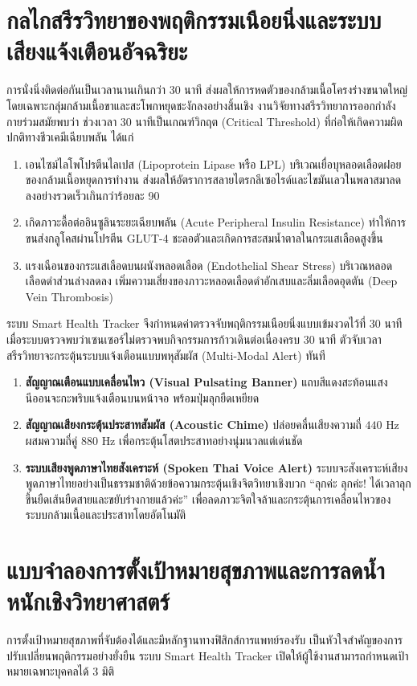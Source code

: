 \section{กลไกสรีรวิทยาของพฤติกรรมเนือยนิ่งและระบบเสียงแจ้งเตือนอัจฉริยะ}
การนั่งนิ่งติดต่อกันเป็นเวลานานเกินกว่า 30 นาที ส่งผลให้การหดตัวของกล้ามเนื้อโครงร่างขนาดใหญ่โดยเฉพาะกลุ่มกล้ามเนื้อขาและสะโพกหยุดชะงักลงอย่างสิ้นเชิง งานวิจัยทางสรีรวิทยาการออกกำลังกายร่วมสมัยพบว่า ช่วงเวลา 30 นาทีเป็นเกณฑ์วิกฤต (Critical Threshold) ที่ก่อให้เกิดความผิดปกติทางชีวเคมีเฉียบพลัน ได้แก่
\begin{enumerate}
    \item เอนไซม์ไลโพโปรตีนไลเปส (Lipoprotein Lipase หรือ LPL) บริเวณเยื่อบุหลอดเลือดฝอยของกล้ามเนื้อหยุดการทำงาน ส่งผลให้อัตราการสลายไตรกลีเซอไรด์และไขมันเลวในพลาสมาลดลงอย่างรวดเร็วเกินกว่าร้อยละ 90
    \item เกิดภาวะดื้อต่ออินซูลินระยะเฉียบพลัน (Acute Peripheral Insulin Resistance) ทำให้การขนส่งกลูโคสผ่านโปรตีน GLUT-4 ชะลอตัวและเกิดการสะสมน้ำตาลในกระแสเลือดสูงขึ้น
    \item แรงเฉือนของกระแสเลือดบนผนังหลอดเลือด (Endothelial Shear Stress) บริเวณหลอดเลือดดำส่วนล่างลดลง เพิ่มความเสี่ยงของภาวะหลอดเลือดดำอักเสบและลิ่มเลือดอุดตัน (Deep Vein Thrombosis)
\end{enumerate}

ระบบ Smart Health Tracker จึงกำหนดค่าตรวจจับพฤติกรรมเนือยนิ่งแบบเข้มงวดไว้ที่ 30 นาที เมื่อระบบตรวจพบว่าเซนเซอร์ไม่ตรวจพบกิจกรรมการก้าวเดินต่อเนื่องครบ 30 นาที ตัวจับเวลาสรีรวิทยาจะกระตุ้นระบบแจ้งเตือนแบบพหุสัมผัส (Multi-Modal Alert) ทันที
\begin{enumerate}
    \item \textbf{สัญญาณเตือนแบบเคลื่อนไหว (Visual Pulsating Banner)} แถบสีแดงสะท้อนแสงนีออนจะกะพริบแจ้งเตือนบนหน้าจอ พร้อมปุ่มลุกยืดเหยียด
    \item \textbf{สัญญาณเสียงกระตุ้นประสาทสัมผัส (Acoustic Chime)} ปล่อยคลื่นเสียงความถี่ $440\text{ Hz}$ ผสมความถี่คู่ $880\text{ Hz}$ เพื่อกระตุ้นโสตประสาทอย่างนุ่มนวลแต่เด่นชัด
    \item \textbf{ระบบเสียงพูดภาษาไทยสังเคราะห์ (Spoken Thai Voice Alert)} ระบบจะสังเคราะห์เสียงพูดภาษาไทยอย่างเป็นธรรมชาติด้วยข้อความกระตุ้นเชิงจิตวิทยาเชิงบวก ``ลุกค่ะ ลุกค่ะ! ได้เวลาลุกขึ้นยืดเส้นยืดสายและขยับร่างกายแล้วค่ะ'' เพื่อลดภาวะจิตใจล้าและกระตุ้นการเคลื่อนไหวของระบบกล้ามเนื้อและประสาทโดยอัตโนมัติ
\end{enumerate}

\section{แบบจำลองการตั้งเป้าหมายสุขภาพและการลดน้ำหนักเชิงวิทยาศาสตร์}
การตั้งเป้าหมายสุขภาพที่จับต้องได้และมีหลักฐานทางฟิสิกส์การแพทย์รองรับ เป็นหัวใจสำคัญของการปรับเปลี่ยนพฤติกรรมอย่างยั่งยืน ระบบ Smart Health Tracker เปิดให้ผู้ใช้งานสามารถกำหนดเป้าหมายเฉพาะบุคคลได้ 3 มิติ

